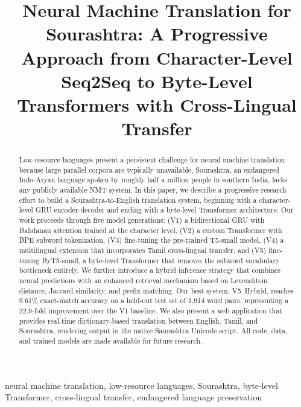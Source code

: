 \documentclass[conference]{IEEEtran}
\begin{document}
\title{Neural Machine Translation for Sourashtra: A Progressive Approach from Character-Level Seq2Seq to Byte-Level Transformers with Cross-Lingual Transfer}

\author{
}

\maketitle

\begin{abstract}
Low-resource languages present a persistent challenge for neural machine translation because large parallel corpora are typically unavailable. Sourashtra, an endangered Indo-Aryan language spoken by roughly half a million people in southern India, lacks any publicly available NMT system. In this paper, we describe a progressive research effort to build a Sourashtra-to-English translation system, beginning with a character-level GRU encoder-decoder and ending with a byte-level Transformer architecture. Our work proceeds through five model generations: (V1) a bidirectional GRU with Bahdanau attention trained at the character level, (V2) a custom Transformer with BPE subword tokenization, (V3) fine-tuning the pre-trained T5-small model, (V4) a multilingual extension that incorporates Tamil cross-lingual transfer, and (V5) fine-tuning ByT5-small, a byte-level Transformer that removes the subword vocabulary bottleneck entirely. We further introduce a hybrid inference strategy that combines neural predictions with an enhanced retrieval mechanism based on Levenshtein distance, Jaccard similarity, and prefix matching. Our best system, V5~Hybrid, reaches 9.61\% exact-match accuracy on a held-out test set of 1,914 word pairs, representing a 22.9-fold improvement over the V1 baseline. We also present a web application that provides real-time dictionary-based translation between English, Tamil, and Sourashtra, rendering output in the native Saurashtra Unicode script. All code, data, and trained models are made available for future research.
\end{abstract}

\begin{IEEEkeywords}
neural machine translation, low-resource languages, Sourashtra, byte-level Transformer, cross-lingual transfer, endangered language preservation
\end{IEEEkeywords}
\end{document}
